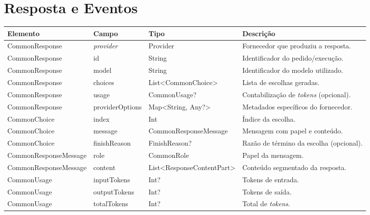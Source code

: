 \section{Resposta e Eventos}


 \begin{table}[H]
    \centering
    \scriptsize
    \setlength{\tabcolsep}{4pt}
    \renewcommand{\arraystretch}{1.2}
    \begin{tabularx}{\textwidth}{|>{\raggedright\arraybackslash}p{3.4cm}|>{\raggedright\arraybackslash}p{2.2cm}|>{\raggedright\arraybackslash}p{3.8cm}|>{\raggedright\arraybackslash}X|}
        \hline
        \textbf{Elemento} & \textbf{Campo} & \textbf{Tipo} & \textbf{Descrição} \\ \hline

        CommonResponse & \textit{provider} & Provider & Fornecedor que produziu a resposta. \\ \hline
        CommonResponse & id & String & Identificador do pedido/execução. \\ \hline
        CommonResponse & model & String & Identificador do modelo utilizado. \\ \hline
        CommonResponse & choices & List<CommonChoice> & Lista de escolhas geradas. \\ \hline
        CommonResponse & usage & CommonUsage? & Contabilização de \textit{tokens} (opcional). \\ \hline
        CommonResponse & providerOptions & Map<String, Any?> & Metadados específicos do fornecedor. \\ \hline

        CommonChoice & index & Int & Índice da escolha. \\ \hline
        CommonChoice & message & CommonResponseMessage & Mensagem com papel e conteúdo. \\ \hline
        CommonChoice & finishReason & FinishReason? & Razão de término da escolha (opcional). \\ \hline

        CommonResponseMessage & role & CommonRole & Papel da mensagem. \\ \hline
        CommonResponseMessage & content & List<ResponseContentPart> & Conteúdo segmentado da resposta. \\ \hline

        CommonUsage & inputTokens & Int? & Tokens de entrada. \\ \hline
        CommonUsage & outputTokens & Int? & Tokens de saída. \\ \hline
        CommonUsage & totalTokens & Int? & Total de \textit{tokens}. \\ \hline


\end{tabularx}
\end{table}
